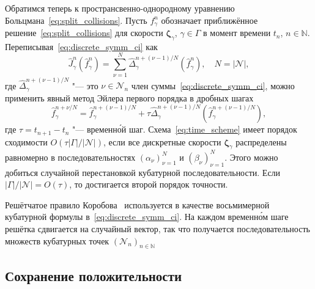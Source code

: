 \documentclass[
aps,%
12pt,%
final,%
notitlepage,%
oneside,%
onecolumn,%
nobibnotes,%
nofootinbib,%
superscriptaddress,%
noshowpacs,%
showkeys,%
floatfix,%
tightenlines,%
centertags]%
{revtex4}
\newcommand{\bzeta}{\boldsymbol{\zeta}}
\newcommand{\Nu}{\mathcal{N}}
\newcommand{\OO}[1]{O(#1)}
\begin{document}
Обратимся теперь к пространсвенно-однородному уравнению Больцмана~\eqref{eq:split_collisions}.
Пусть \(f_\gamma^n\) обозначает приближённое решение~\eqref{eq:split_collisions}
для скорости \(\bzeta_\gamma\), \(\gamma\in\Gamma\) в момент времени \(t_n\), \(n\in\mathbb{N}\).
Переписывая~\eqref{eq:discrete_symm_ci} как
\begin{equation}\label{eq:discrete_short_ci}
    \hat{J}_\gamma^n\left(\hat{f}_\gamma^n\right) =
        \sum_{\nu=1}^N \hat{\Delta}_\gamma^{n+(\nu-1)/N} \left(\hat{f}_\gamma^n\right), \quad
    N=|\Nu|,
\end{equation}
где \(\hat{\Delta}_\gamma^{n+(\nu-1)/N}\) "--- это \(\nu\in\Nu_n\) член суммы~\eqref{eq:discrete_symm_ci},
можно применить явный метод Эйлера первого порядка в дробных шагах
\begin{equation}\label{eq:time_scheme}
    \hat{f}_\gamma^{n+\nu/N} = \hat{f}_\gamma^{n+(\nu-1)/N} + \tau \hat{\Delta}_\gamma^{n+(\nu-1)/N}
    \left(\hat{f}_\gamma^{n+(\nu-1)/N}\right),
\end{equation}
где \(\tau = t_{n+1} - t_n\) "--- временн\'{о}й шаг.
Схема~\eqref{eq:time_scheme} имеет порядок сходимости \(\OO{\tau|\Gamma|/|\Nu|}\),
если все дискретные скорости \(\bzeta_\gamma\) распределены равномерно
в последовательностях \((\alpha_\nu)_{\nu=1}^N\) и \((\beta_\nu)_{\nu=1}^N\).
Этого можно добиться случайной перестановкой кубатурной последовательности.
Если \(|\Gamma|/|\Nu| = \OO{\tau}\), то достигается второй порядок точности.

Решётчатое правило Коробова~\citep{Korobov1959, Sloan1994} используется в качестве
восьмимерной кубатурной формулы в~\eqref{eq:discrete_symm_ci}.
На каждом временн\'{о}м шаге решётка сдвигается на случайный вектор,
так что получается последовательность множеств кубатурных точек \((\Nu_n)_{n\in\mathbb{N}}\)

\subsection{Сохранение положительности}
\end{document}
